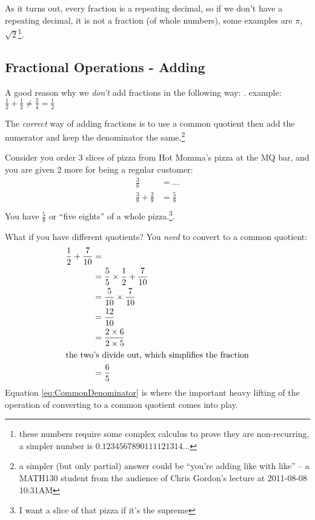 As it turns out, every fraction is a repeating decimal, so if we don't have a
repeating decimal, it is not a fraction (of whole numbers), some examples are
$\pi$, $\sqrt{2}$\footnote{these numbers require some complex calculus to prove
they are non-recurring, a simpler number is $0.1234567890111121314\ldots$}.

\newpage
\subsection{Fractional Operations - Adding}
\label{sec:FractionalOperationsAdding}
A good reason why we \emph{don't} add fractions in the following way:
.
example: $\frac{1}{2} + \frac{1}{2} \neq \frac{2}{4} = \frac{1}{2}$

The \emph{correct} way of adding fractions is to use a common quotient then add
the numerator and keep the denominator the same.\footnote{a simpler (but only
partial) answer could be ``you're adding like with like'' -- a MATH130 student
from the audience of Chris Gordon's lecture at 2011-08-08 10:31AM}

Consider you order 3 slices of pizza from Hot Momma's pizza at the MQ bar, and
you are given 2 more for being a regular customer:
\begin{align}
  \frac{3}{8} & = \ldots \\
  \frac{3}{8} + \frac{2}{8} & = \frac{5}{8} \\
\end{align}
You have $\frac{5}{8}$ or ``five eights'' of a whole pizza.\footnote{I want a
slice of that pizza if it's the supreme}.

What if you have different quotients? You \emph{need} to convert to a common
quotient:
\begin{align}
 \frac{1}{2} + \frac{7}{10} & = \\
    & = \frac{5}{5} \times \frac{1}{2} + \frac{7}{10} \\
    & = \frac{5}{10} \times \frac{7}{10} \label{eq:CommonDenominator}\\
    & = \frac{12}{10} \\
    & = \frac{2 \times 6}{2 \times 5} \\
  \intertext{the two's divide out, which simplifies the fraction}  
    & = \frac{6}{5} \\
\end{align}
Equation \ref{eq:CommonDenominator} is where the important heavy lifting of the
operation of converting to a common quotient comes into play.

